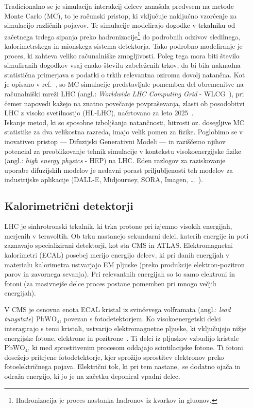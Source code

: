 \documentclass[12pt, a4paper]{article}
\newcommand{\chem}[1]{\ensuremath{\mathrm{#1}}}  %
\begin{document}
Tradicionalno se je simulacija interakcij delcev zanašala predvsem na metode Monte Carlo (MC), to je računski pristop, ki vključuje naključno vzorčenje za simulacijo različnih pojavov. Te simulacije modelirajo dogodke v trkalniku od začetnega trdega sipanja preko hadronizacije\footnote{Hadronizacija je proces nastanka hadronov iz kvarkov in gluonov.} do podrobnih odzivov sledilnega, kalorimetrskega in mionskega sistema detektorja. Tako podrobno modeliranje je proces, ki zahteva veliko računalniške zmogljivosti. Poleg tega mora biti število simuliranih dogodkov vsaj enako številu zabeleženih trkov, da bi bila naknadna statistična primerjava s podatki o trkih relevantna oziroma dovolj natančna. Kot je opisano v ref.~\cite{GANforfastsim}, so MC simulacije predstavljale pomemben del obremenitve na računalniški mreži LHC (angl.: \textit{Worldwide LHC Computing Grid} - WLCG~\cite{WLCG}), pri čemer napovedi kažejo na znatno povečanje povpraševanja, zlasti ob posodobitvi LHC z visoko svetilnostjo (HL-LHC), načrtovano za leto 2025~\cite{HL-LHC}. \\
Iskanje metod, ki so sposobne izboljšanja natančnosti, hitrosti oz. dosegljive MC statistike za dva velikostna razreda, imajo velik pomen za fizike. Poglobimo se v inovativen pristop — Difuzijski Generativni Modeli — in raziščemo njihov potencial za preoblikovanje tehnik simulacije v kontekstu visokoenergijske fizike (angl.: \textit{high energy physics} - HEP) na LHC. Eden razlogov za raziskovanje uporabe difuzijskih modelov je nedavni porast priljubljenosti teh modelov za industrijske aplikacije (DALL-E, Midjourney, SORA, Imagen, …~\cite{DALL-E, Midjourney, SORRA, Imagen}).


\subsection{Kalorimetrični detektorji}

LHC je sinhrotronski trkalnik, ki trka protone pri izjemno visokih energijah, merjenih v teravoltih. Ob trku nastanejo sekundarni delci, katerih energije in poti zaznavajo specializirani detektorji, kot sta CMS in ATLAS.
Elektromagnetni kalorimetri (ECAL) posebej merijo energijo delcev, ki pri danih energijah v materialu kalorimetra ustvarjajo EM pljuske (preko produkcije elektron-pozitron parov in zavornega sevanja). Pri relevantnih energijah so to samo elektroni in fotoni (za masivnejše delce proces postane pomemben pri mnogo večjih energijah). 

V CMS je osnovna enota ECAL kristal iz svinčevega volframata (angl.: \textit{lead tungstate}) \chem{PbWO_4}, povezan s fotodetektorjem. Ko visokoenergetski delci interagirajo s temi kristali, ustvarijo elektromagnetne pljuske, ki vključujejo nižje energijske fotone, elektrone in pozitrone~\cite{ecal-tdr, Mastnak}.
Ti delci iz pljuskov vzbudijo kristale \chem{PbWO_4}, ki med sprostitvenim procesom oddajajo scintilacijske fotone. Ti fotoni dosežejo pritrjene fotodetektorje, kjer sprožijo sprostitev elektronov preko fotoelektričnega pojava. Električni tok, ki pri tem nastane,\, se dodatno ojača in odraža energijo, ki jo je na začetku deponiral vpadni delec.
\end{document}
